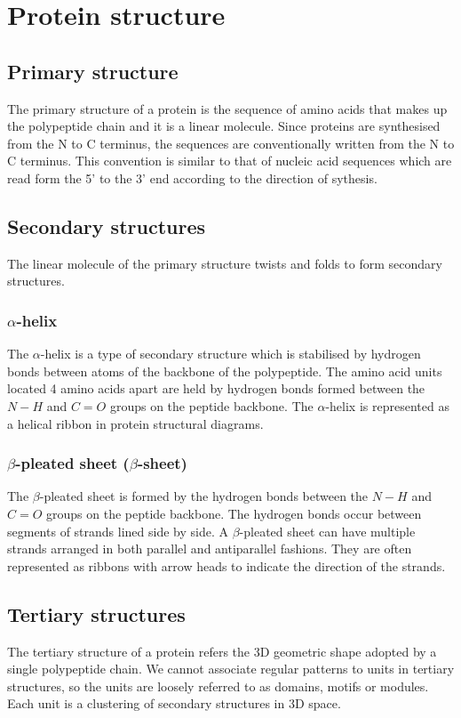 \documentclass[11pt]{article}
\begin{document}
\section{Protein structure}
\label{sec:orgbd47d75}

\subsection{Primary structure}
\label{sec:orgdad1c2d}
The primary structure of a protein is the sequence of amino acids that makes up the polypeptide chain and it is a linear molecule. Since proteins are synthesised from the N to C terminus, the sequences are conventionally written from the N to C terminus. This convention is similar to that of nucleic acid sequences which are read form the 5' to the 3' end according to the direction of sythesis.

\subsection{Secondary structures}
\label{sec:orgabf3208}
The linear molecule of the primary structure twists and folds to form secondary structures.

\subsubsection{\(\alpha\)-helix}
\label{sec:org1cb53f5}
The \(\alpha\)-helix is a type of secondary structure which is stabilised by hydrogen bonds between atoms of the backbone of the polypeptide. The amino acid units located 4 amino acids apart are held by hydrogen bonds formed between the \(N-H\) and \(C=O\) groups on the peptide backbone. The \(\alpha\)-helix is represented as a helical ribbon in protein structural diagrams.

\subsubsection{\(\beta\)-pleated sheet (\(\beta\)-sheet)}
\label{sec:org98cf515}
The \(\beta\)-pleated sheet is formed by the hydrogen bonds between the \(N-H\) and \(C=O\) groups on the peptide backbone. The hydrogen bonds occur between segments of strands lined side by side. A \(\beta\)-pleated sheet can have multiple strands arranged in both parallel and antiparallel fashions. They are often represented as ribbons with arrow heads to indicate the direction of the strands.

\subsection{Tertiary structures}
\label{sec:orgb3650e1}
The tertiary structure of a protein refers the 3D geometric shape adopted by a single polypeptide chain. We cannot associate regular patterns to units in tertiary structures, so the units are loosely referred to as domains, motifs or modules. Each unit is a clustering of secondary structures in 3D space.
\end{document}
